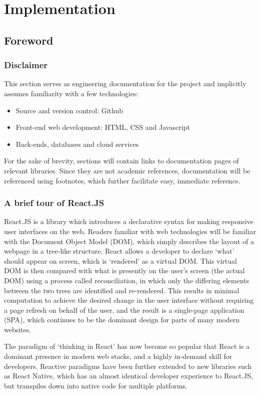 \chapter{Implementation}
\section{Foreword}

\subsection{Disclaimer}
This section serves as engineering documentation for the project and implicitly assumes familiarity with a few technologies:
\begin{itemize}
    \item Source and version control: Github
    \item Front-end web development: HTML, CSS and Javascript
    \item Back-ends, databases and cloud services
\end{itemize}

For the sake of brevity, sections will contain links to documentation pages of relevant libraries. Since they are not academic references, documentation will be referenced using footnotes, which further facilitate easy, immediate reference.

\subsection{A brief tour of React.JS}
React.JS is a library which introduces a declarative syntax for making responsive user interfaces on the web. Readers familiar with web technologies will be familiar with the Document Object Model (DOM), which simply describes the layout of a webpage in a tree-like structure. React allows a developer to declare `what' should appear on screen, which is `rendered' as a virtual DOM. This virtual DOM is then compared with what is presently on the user's screen (the actual DOM) using a process called reconciliation, in which only the differing elements between the two trees are identified and re-rendered. This results in minimal computation to achieve the desired change in the user interface without requiring a page refresh on behalf of the user, and the result is a single-page application (SPA), which continues to be the dominant design for parts of many modern websites.

The paradigm of `thinking in React' has now become so popular that React is a dominant presence in modern web stacks, and a highly in-demand skill for developers. Reactive paradigms have been further extended to new libraries such as React Native, which has an almost identical developer experience to React.JS, but transpiles down into native code for multiple platforms.

